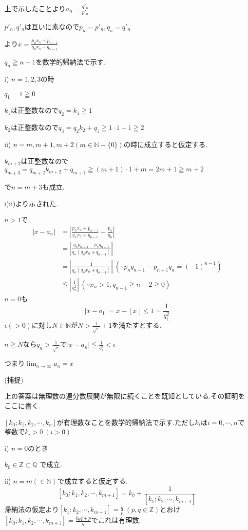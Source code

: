 \documentclass{jsarticle}
\begin{document}
上で示したことより$a_n=\frac{q'_n}{p'_n}$

$p'_n,q'_n$は互いに素なので$p_n=p'_n,q_n=q'_n$

より$x=\frac{p_nx_n+p_{n-1}}{q_nx_n+q_{n-1}}$

$q_n \geqq n-1$を数学的帰納法で示す.

i) $n=1,2,3$の時

$q_1=1\geqq 0$

$k_1$は正整数なので$q_2=k_1\geqq 1$

$k_2$は正整数なので$q_3=q_2k_2+q_1\geqq 1\cdot 1 + 1 \geqq 2$

ii) $n=m,m+1,m+2 (m\in \mathbb{N}-\{0\})$の時に成立すると仮定する.

$k_{m+2}$は正整数なので$q_{m+3}=q_{m+2}k_{m+2}+q_{m+1} \geqq (m+1)\cdot 1 +m = 2m+1 \geqq m+2 $

で$n=m+3$も成立.

i)ii)より示された.

$n > 1$で
\begin{align*}
|x-a_n| &= |\frac{p_nx_n+p_{n-1}}{q_nx_n+q_{n-1}}-\frac{p_n}{q_n}|\\
&=|\frac{q_np_{n-1}-p_nq_{n-1}}{q_n(q_nx_n+q_{n-1})}|\\
&= |\frac{1}{q_n(q_nx_n+q_{n-1})}| \ (\because p_nq_{n-1}-p_{n-1}q_n=(-1)^{n-1})\\
&\leqq |\frac{1}{q_n^2}| \ (\because x_n >1 ,q_{n-1}\geqq n-2\geqq 0) 
\end{align*}
$n=0$も
\[|x-a_1|=x-[x]\leq 1=\frac{1}{q_1^2}\]
$\epsilon(>0)$に対し$N\in\mathbb{N}$が$N>\frac{1}{\sqrt{\epsilon}}+1$を満たすとする.

$n\geqq N$なら$q_n > \frac{1}{\sqrt{\epsilon}}$で$|x-a_n|\leqq \frac{1}{q_1^2}<\epsilon$

つまり$\displaystyle\lim_{n\to \infty}a_n=x$

(捕捉)

上の答案は無理数の連分数展開が無限に続くことを既知としている.その証明をここに書く.

$[k_0;k_1,k_2,\cdots,k_n]$が有理数なことを数学的帰納法で示す.ただし$k_i$は$i=0,\cdots, n$で整数で$k_i>0 \ (i>0)$

i) $n=0$のとき

$k_0\in\mathbb{Z}\subset \mathbb{Q}$
で成立.

ii) $n=m(\in\mathbb{N})$で成立すると仮定する.
\[[k_0;k_1,k_2,\cdots ,k_{m+1}]=k_0+\frac{1}{[k_1;k_2,\cdots ,k_{m+1}]}\]
帰納法の仮定より$[k_1;k_2,\cdots ,k_{m+1}]=\frac{q}{p} \ (p,q\in\mathbb{Z})$とおけ$[k_0;k_1,k_2,\cdots ,k_{m+1}]=\frac{k_0q+p}{q}$でこれは有理数.
\end{document}
